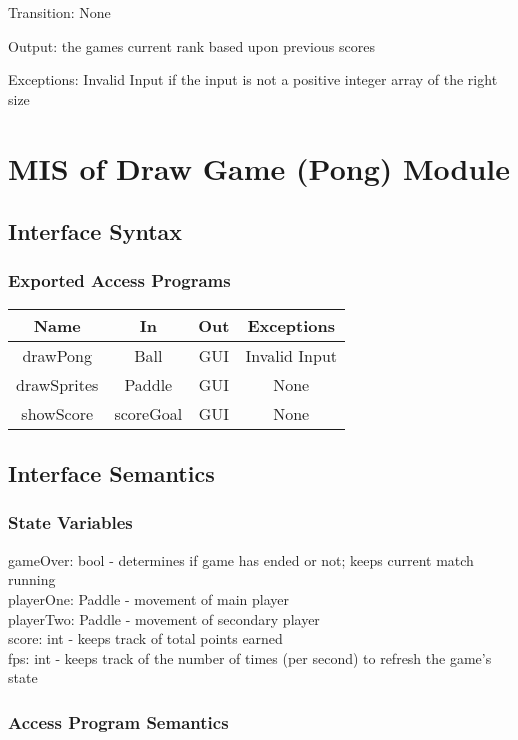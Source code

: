 \documentclass[12pt, titlepage]{article}
\begin{document}
		Transition: None
		
		Output: the games current rank based upon previous scores
		
		Exceptions: Invalid Input if the input is not a positive integer array of the right size

\section{MIS of Draw Game (Pong) Module}
		\subsection{Interface Syntax}
		\subsubsection{Exported Access Programs}
		\begin{tabular}[pos]{|c|c|c|c|}
			\hline
			\textbf{Name}& \textbf{In} & \textbf{Out} & \textbf{Exceptions} \\ \hline
			drawPong & Ball & GUI & Invalid Input \\ \hline
			drawSprites & Paddle & GUI & None \\ \hline
			showScore & scoreGoal & GUI & None \\ \hline
		\end{tabular}
		
		\subsection{Interface Semantics}
		\subsubsection{State Variables}
		gameOver: bool - determines if game has ended or not; keeps current match running \\
		playerOne: Paddle - movement of main player \\
		playerTwo: Paddle - movement of secondary player \\
		score: int - keeps track of total points earned \\
		fps: int - keeps track of the number of times (per second) to refresh the game's state
		
		\subsubsection{Access Program Semantics}
		
\end{document}
